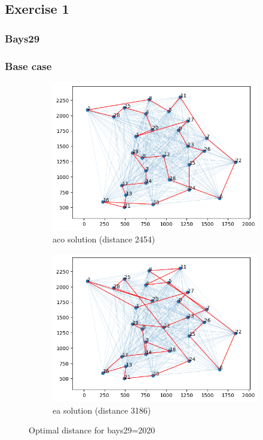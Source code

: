 \subsection{Exercise 1}
\subsubsection{Bays29}
\subsubsection*{Base case}
\begin{figure}[H]
    \centering
    \begin{subfigure}[t]{0.5\textwidth}
        \centering
        \includegraphics[width=\linewidth]{images/lab7/tsp_base_aco.png}
        \caption{aco solution (distance 2454)}
    \end{subfigure}%
    \begin{subfigure}[t]{0.5\textwidth}
        \centering
        \includegraphics[width=\linewidth]{images/lab7/tsp_base_ea.png}
        \caption{ea solution (distance 3186)}
    \end{subfigure}
    \caption{Optimal distance for bays29=2020}
\end{figure}
